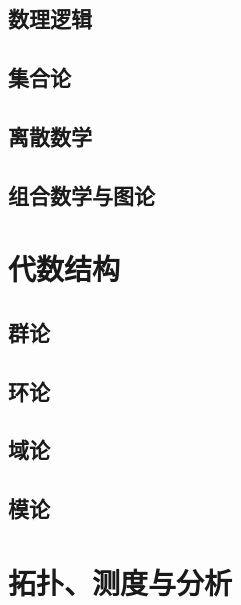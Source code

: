 \documentclass[zihao=false,linespread=1.5,heading=true,a4paper,oneside,fontset=windows]{ctexbook}
\begin{document}
\chapter{数理逻辑}\label{chap:mathematical-logic}


\chapter{集合论}\label{chap:set-theory}


\chapter{离散数学}\label{chap:discrete-mathematics}


\chapter{组合数学与图论}\label{chap:combinatorics-and-graph-theory}


\part{代数结构}\label{part:algebraic-structures}

\chapter{群论}\label{chap:group-theory}


\chapter{环论}\label{chap:ring-theory}


\chapter{域论}\label{chap:field-theory}


\chapter{模论}\label{chap:module-theory}


\part{拓扑、测度与分析}\label{part:analysis-foundations}
\end{document}
